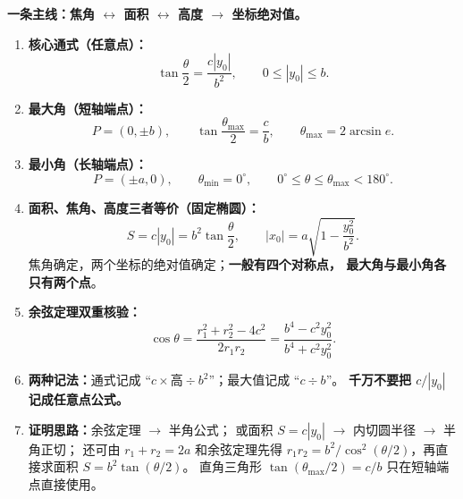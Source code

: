 \begin{summarybox}
\textbf{一条主线：焦角 $\longleftrightarrow$ 面积 $\longleftrightarrow$ 高度
$\longrightarrow$ 坐标绝对值。}

\begin{enumerate}
  \item \textbf{核心通式（任意点）：}
  \[
  \boxed{\tan\frac\theta2=\frac{c|y_0|}{b^2}},
  \qquad 0\leq|y_0|\leq b.
  \]

  \item \textbf{最大角（短轴端点）：}
  \[
  \boxed{P=(0,\pm b)},\qquad
  \boxed{\tan\frac{\theta_{\max}}2=\frac cb},\qquad
  \boxed{\theta_{\max}=2\arcsin e}.
  \]

  \item \textbf{最小角（长轴端点）：}
  \[
  \boxed{P=(\pm a,0)},\qquad
  \boxed{\theta_{\min}=0^\circ},\qquad
  \boxed{0^\circ\leq\theta\leq\theta_{\max}<180^\circ}.
  \]

  \item \textbf{面积、焦角、高度三者等价（固定椭圆）：}
  \[
  \boxed{S=c|y_0|=b^2\tan\frac\theta2},\qquad
  \boxed{|x_0|=a\sqrt{1-\frac{y_0^2}{b^2}}}.
  \]
  焦角确定，两个坐标的绝对值确定；\textbf{一般有四个对称点，
  最大角与最小角各只有两个点}。

  \item \textbf{余弦定理双重核验：}
  \[
  \boxed{\cos\theta
   =\frac{r_1^2+r_2^2-4c^2}{2r_1r_2}
   =\frac{b^4-c^2y_0^2}{b^4+c^2y_0^2}}.
  \]

  \item \textbf{两种记法：}通式记成
  ``$c\times\text{高}\div b^2$''；最大值记成 ``$c\div b$''。
  \textbf{千万不要把 $c/|y_0|$ 记成任意点公式。}

  \item \textbf{证明思路：}余弦定理 $\to$ 半角公式；
  或面积 $S=c|y_0|$ $\to$ 内切圆半径 $\to$ 半角正切；
  还可由 $r_1+r_2=2a$ 和余弦定理先得
  $r_1r_2=b^2/\cos^2(\theta/2)$，再直接求面积
  $S=b^2\tan(\theta/2)$。
  直角三角形 $\tan(\theta_{\max}/2)=c/b$ 只在短轴端点直接使用。
\end{enumerate}
\end{summarybox}
